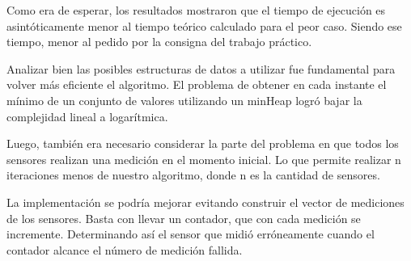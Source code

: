 \quad Como era de esperar, los resultados mostraron que el tiempo de ejecuci\'on es asint\'oticamente menor al tiempo te\'orico calculado para el peor caso. Siendo ese tiempo, menor al pedido por la consigna del trabajo pr\'actico.


\quad Analizar bien las posibles estructuras de datos a utilizar fue fundamental para volver m\'as eficiente el algoritmo. El problema de obtener en cada instante el m\'inimo de un conjunto de valores utilizando un minHeap logr\'o bajar la complejidad lineal a logar\'itmica.

\quad

\quad Luego, tambi\'en era necesario considerar la parte del problema en que todos los sensores realizan una medici\'on en el momento inicial. Lo que permite realizar n iteraciones menos de nuestro algoritmo, donde n es la cantidad de sensores.

\quad La implementaci\'on se podr\'ia mejorar evitando construir el vector de mediciones de los sensores. Basta con llevar un contador, que con cada medici\'on se incremente. Determinando as\'i el sensor que midi\'o err\'oneamente cuando el contador alcance el n\'umero de medici\'on fallida.